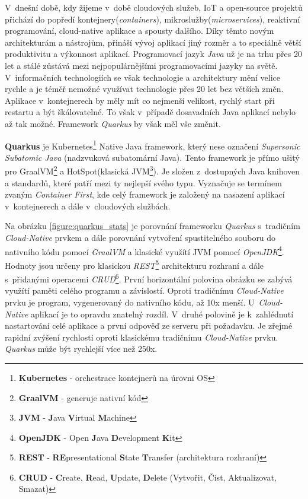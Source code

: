 V~dnešní době, kdy žijeme v~době cloudových služeb, IoT a open-source projektů přichází do popředí kontejnery(\emph{containers}), mikroslužby(\emph{microservices}), reaktivní programování, cloud-native aplikace a spousty dalšího.
Díky těmto novým architekturám a nástrojům, přináší vývoj aplikací jiný rozměr a to speciálně větší produktivitu a výkonnost aplikací.
Programovací jazyk \emph{Java} už je na trhu přes 20 let a stálé zůstává mezi nejpopulárnějšími programovacími jazyky na světě.
V~informačních technologiích se však technologie a architektury mění velice rychle a je téměř nemožné využívat technologie přes 20 let bez větších změn. Aplikace v~kontejnerech by měly mít co nejmenší velikost, rychlý start při restartu a být škálovatelné.
To však v~případě dosavadních Java aplikací nebylo až tak možné. Framework \emph{Quarkus} by však měl vše změnit.

\textbf{Quarkus} je Kubernetes\footnote{\textbf{Kubernetes} - orchestrace kontejnerů na úrovni OS} Native Java framework, který nese označení \emph{Supersonic Subatomic Java} (nadzvuková subatomární Java).
Tento framework je přímo ušitý pro GraalVM\footnote{\textbf{GraalVM} - generuje nativní kód} a HotSpot(klasická JVM\footnote{\textbf{JVM} - \textbf{J}ava \textbf{V}irtual \textbf{M}achine}).
Je složen z~dostupných Java knihoven a standardů, které patří mezi ty nejlepší svého typu.
Vyznačuje se termínem zvaným \emph{Container First}, kde celý framework je založený na nasazení aplikací v~kontejnerech a dále v~cloudových službách.~\cite{quarkus:infoDev}

Na obrázku \ref{figure:quarkus_stats} je porovnání frameworku \emph{Quarkus} s~tradičním \emph{Cloud-Native} prvkem a dále porovnání vytvoření spustitelného souboru do nativního kódu pomocí \emph{GraalVM} a klasické využítí JVM pomocí \emph{OpenJDK}\footnote{\textbf{OpenJDK} - Open \textbf{J}ava \textbf{D}evelopment \textbf{K}it}.
Hodnoty jsou určeny pro klasickou \emph{REST}\footnote{\textbf{REST} - \textbf{RE}presentational \textbf{S}tate \textbf{T}ransfer (architektura rozhraní)} architekturu rozhraní a dále s~přidanými operacemi \emph{CRUD}\footnote{\textbf{CRUD} - \textbf{C}reate, \textbf{R}ead, \textbf{U}pdate, \textbf{D}elete (Vytvořit, Číst, Aktualizovat, Smazat)}.
První horizontální polovina obrázku se zabývá využítí paměti celého programu a závislostí.
Oproti tradičnímu \emph{Cloud-Native} prvku je program, vygenerovaný do nativního kódu, až 10x menší.
U~\emph{Cloud-Native} aplikací je to opravdu znatelný rozdíl.
V~druhé polovině je k~zahlédnutí nastartování celé aplikace a první odpověď ze serveru při požadavku.
Je zřejmé rapidní zvýšení rychlosti oproti klasickému tradičnímu \emph{Cloud-Native} prvku.
\emph{Quarkus} může být rychlejší více než 250x.~\cite{quarkus:website}

